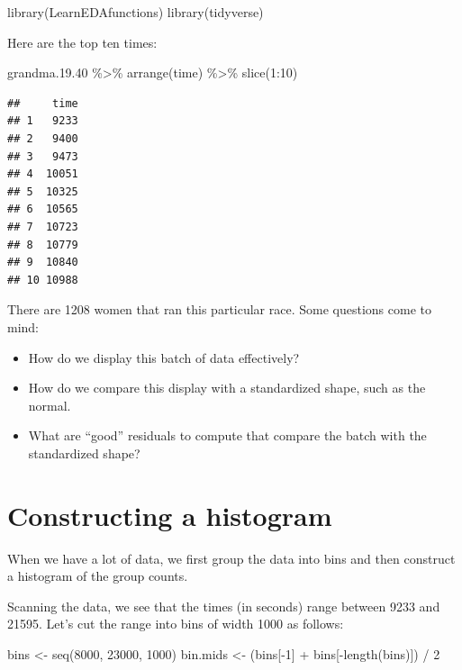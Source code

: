 \documentclass[
]{book}
\newenvironment{Shaded}{\begin{snugshade}}{\end{snugshade}}
\newcommand{\DecValTok}[1]{\textcolor[rgb]{0.00,0.00,0.81}{#1}}
\newcommand{\FloatTok}[1]{\textcolor[rgb]{0.00,0.00,0.81}{#1}}
\newcommand{\FunctionTok}[1]{\textcolor[rgb]{0.00,0.00,0.00}{#1}}
\newcommand{\NormalTok}[1]{#1}
\newcommand{\OtherTok}[1]{\textcolor[rgb]{0.56,0.35,0.01}{#1}}
\newcommand{\SpecialCharTok}[1]{\textcolor[rgb]{0.00,0.00,0.00}{#1}}
\providecommand{\tightlist}{%
  \setlength{\itemsep}{0pt}\setlength{\parskip}{0pt}}
\begin{document}
\begin{Shaded}
\begin{Highlighting}[]
\FunctionTok{library}\NormalTok{(LearnEDAfunctions)}
\FunctionTok{library}\NormalTok{(tidyverse)}
\end{Highlighting}
\end{Shaded}

Here are the top ten times:

\begin{Shaded}
\begin{Highlighting}[]
\NormalTok{grandma.}\FloatTok{19.40} \SpecialCharTok{\%\textgreater{}\%} 
  \FunctionTok{arrange}\NormalTok{(time) }\SpecialCharTok{\%\textgreater{}\%} 
  \FunctionTok{slice}\NormalTok{(}\DecValTok{1}\SpecialCharTok{:}\DecValTok{10}\NormalTok{)}
\end{Highlighting}
\end{Shaded}

\begin{verbatim}
##     time
## 1   9233
## 2   9400
## 3   9473
## 4  10051
## 5  10325
## 6  10565
## 7  10723
## 8  10779
## 9  10840
## 10 10988
\end{verbatim}

There are 1208 women that ran this particular race. Some questions come to mind:

\begin{itemize}
\tightlist
\item
  How do we display this batch of data effectively?
\item
  How do we compare this display with a standardized shape, such as the normal.
\item
  What are ``good'' residuals to compute that compare the batch with the standardized shape?
\end{itemize}

\hypertarget{constructing-a-histogram}{%
\section{Constructing a histogram}\label{constructing-a-histogram}}

When we have a lot of data, we first group the data into bins and then construct a histogram of the group counts.

Scanning the data, we see that the times (in seconds) range between 9233 and 21595. Let's cut the range into bins of width 1000 as follows:

\begin{Shaded}
\begin{Highlighting}[]
\NormalTok{bins }\OtherTok{\textless{}{-}} \FunctionTok{seq}\NormalTok{(}\DecValTok{8000}\NormalTok{, }\DecValTok{23000}\NormalTok{, }\DecValTok{1000}\NormalTok{)}
\NormalTok{bin.mids }\OtherTok{\textless{}{-}}\NormalTok{ (bins[}\SpecialCharTok{{-}}\DecValTok{1}\NormalTok{] }\SpecialCharTok{+}\NormalTok{ bins[}\SpecialCharTok{{-}}\FunctionTok{length}\NormalTok{(bins)]) }\SpecialCharTok{/} \DecValTok{2}
\end{Highlighting}
\end{Shaded}
\end{document}
